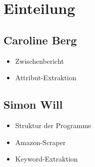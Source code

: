\documentclass[a4paper]{article}
\begin{document}
\section{Einteilung}


\subsection{Caroline Berg}
\begin{itemize}
	\item Zwischenbericht
	\item Attribut-Extraktion
\end{itemize}


\subsection{Simon Will}
\begin{itemize}
	\item Struktur der Programme
	\item Amazon-Scraper
	\item Keyword-Extraktion
\end{itemize}



\printbibliography
\end{document}
